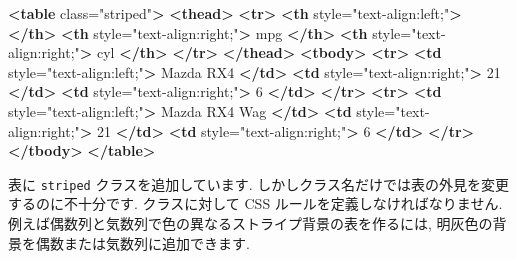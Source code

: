 \documentclass[
  11pt,
]{bxjsreport}
\newenvironment{Shaded}{\begin{snugshade}}{\end{snugshade}}
\newcommand{\KeywordTok}[1]{\textcolor[rgb]{0.13,0.29,0.53}{\textbf{#1}}}
\newcommand{\NormalTok}[1]{#1}
\newcommand{\OtherTok}[1]{\textcolor[rgb]{0.56,0.35,0.01}{#1}}
\newcommand{\StringTok}[1]{\textcolor[rgb]{0.31,0.60,0.02}{#1}}
\begin{document}
\begin{Shaded}
\begin{Highlighting}[]
\KeywordTok{\textless{}table}\OtherTok{ class=}\StringTok{"striped"}\KeywordTok{\textgreater{}}
 \KeywordTok{\textless{}thead\textgreater{}}
  \KeywordTok{\textless{}tr\textgreater{}}
   \KeywordTok{\textless{}th}\OtherTok{ style=}\StringTok{"text{-}align:left;"}\KeywordTok{\textgreater{}}   \KeywordTok{\textless{}/th\textgreater{}}
   \KeywordTok{\textless{}th}\OtherTok{ style=}\StringTok{"text{-}align:right;"}\KeywordTok{\textgreater{}}\NormalTok{ mpg }\KeywordTok{\textless{}/th\textgreater{}}
   \KeywordTok{\textless{}th}\OtherTok{ style=}\StringTok{"text{-}align:right;"}\KeywordTok{\textgreater{}}\NormalTok{ cyl }\KeywordTok{\textless{}/th\textgreater{}}
  \KeywordTok{\textless{}/tr\textgreater{}}
 \KeywordTok{\textless{}/thead\textgreater{}}
\KeywordTok{\textless{}tbody\textgreater{}}
  \KeywordTok{\textless{}tr\textgreater{}}
   \KeywordTok{\textless{}td}\OtherTok{ style=}\StringTok{"text{-}align:left;"}\KeywordTok{\textgreater{}}\NormalTok{ Mazda RX4 }\KeywordTok{\textless{}/td\textgreater{}}
   \KeywordTok{\textless{}td}\OtherTok{ style=}\StringTok{"text{-}align:right;"}\KeywordTok{\textgreater{}}\NormalTok{ 21 }\KeywordTok{\textless{}/td\textgreater{}}
   \KeywordTok{\textless{}td}\OtherTok{ style=}\StringTok{"text{-}align:right;"}\KeywordTok{\textgreater{}}\NormalTok{ 6 }\KeywordTok{\textless{}/td\textgreater{}}
  \KeywordTok{\textless{}/tr\textgreater{}}
  \KeywordTok{\textless{}tr\textgreater{}}
   \KeywordTok{\textless{}td}\OtherTok{ style=}\StringTok{"text{-}align:left;"}\KeywordTok{\textgreater{}}\NormalTok{ Mazda RX4 Wag }\KeywordTok{\textless{}/td\textgreater{}}
   \KeywordTok{\textless{}td}\OtherTok{ style=}\StringTok{"text{-}align:right;"}\KeywordTok{\textgreater{}}\NormalTok{ 21 }\KeywordTok{\textless{}/td\textgreater{}}
   \KeywordTok{\textless{}td}\OtherTok{ style=}\StringTok{"text{-}align:right;"}\KeywordTok{\textgreater{}}\NormalTok{ 6 }\KeywordTok{\textless{}/td\textgreater{}}
  \KeywordTok{\textless{}/tr\textgreater{}}
\KeywordTok{\textless{}/tbody\textgreater{}}
\KeywordTok{\textless{}/table\textgreater{}}
\end{Highlighting}
\end{Shaded}

表に \texttt{striped} クラスを追加しています. しかしクラス名だけでは表の外見を変更するのに不十分です. クラスに対して CSS ルールを定義しなければなりません. 例えば偶数列と気数列で色の異なるストライプ背景の表を作るには, 明灰色の背景を偶数または気数列に追加できます.
\end{document}
